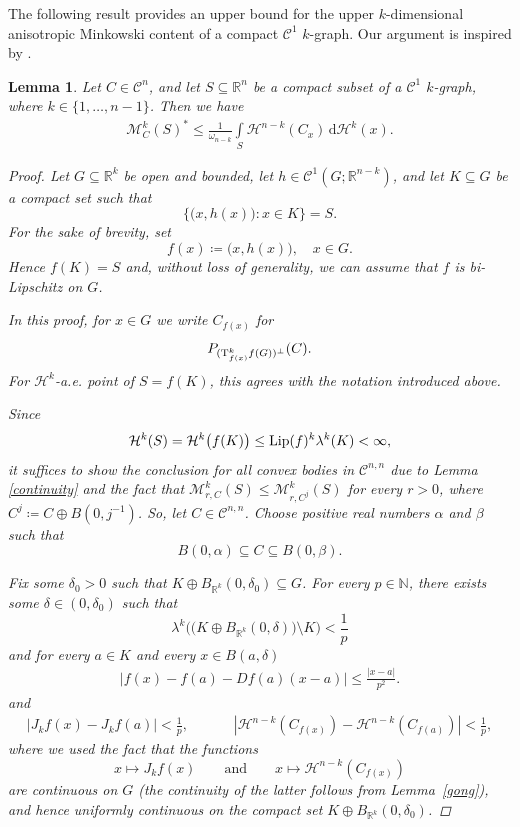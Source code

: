 \documentclass[pdflatex,sn-mathphys-num]{sn-jnl}
\theoremstyle{plain}
\newtheorem{lemma}[theorem]{Lemma}
\theoremstyle{definition}
\newcommand{\dH}[1]{\,\mathrm d\mathcal{H}^{#1}}
\begin{document}
The following result provides an upper bound for the upper 
$k$-dimensional anisotropic Minkowski content of a compact $\mathcal{C}^1$ 
$k$-graph. Our argument is inspired by \cite[Lemma 3.2.38]{federer}.
\begin{lemma}\label{krect}
        Let $C\in\mathcal{C}^n$, and let $S\subseteq\mathbb{R}^n$ be a compact subset of a $\mathcal{C}^1$ $k$-graph, where $k\in\{1, \dots, n-1\}$. Then we have \begin{align*}
            \mathcal{M}^k_{C}(S)^*\leq\frac{1}{\omega_{n-k}}\int\limits_{S}\mathcal{H}^{n-k}(C_x)\dH{k}(x).
        \end{align*}
        \begin{proof} Let $G\subseteq\mathbb{R}^k$ be open and bounded, let $h\in\mathcal{C}^1(G; \mathbb{R}^{n-k})$, and let $K\subseteq G$ be a compact set such that $$\big\{\big(x, h(x)\big) : x\in K\}=S.$$ For the sake of brevity, set $$f(x)\coloneq \big(x, h(x)\big), \quad x\in G.$$ Hence $f(K)=S$ and, without loss of generality, we can assume that  $f$ is bi-Lipschitz on $G$.

        In this proof, for $x\in G$ we write $C_{f(x)}$ for
\[
P_{(\textup{T}^k_{f(x)}f(G))^\perp}(C).
\]
For $\mathcal H^k$-a.e. point of $S=f(K)$, this agrees with the notation
introduced above.

        Since $$\mathcal{H}^k(S)=\mathcal{H}^k\big(f(K)\big)\leq\textup{Lip}(f)^k\lambda^k(K)<\infty,$$ it suffices to show the conclusion for all convex bodies in $\mathcal{C}^{n, n}$ due to Lemma \ref{continuity} and the fact that $\mathcal{M}^k_{r, C}(S)\leq \mathcal{M}^k_{r, C^j}(S)$ for every $r>0$, where $C^j\coloneqq C\oplus B(0, j^{-1})$. So, let $C\in\mathcal{C}^{n, n}$. Choose positive real numbers $\alpha$ and $\beta$ such that \begin{equation}\label{constants}
            B(0, \alpha)\subseteq C \subseteq B(0, \beta).
        \end{equation}
            
            
            Fix some $\delta_0>0$ such that $K\oplus  B_{\mathbb{R}^k}(0, \delta_0)\subseteq G$. For every $p\in\mathbb{N}$, there exists some $\delta\in (0, \delta_0)$ such that 
            \begin{equation}\label{eq1}
                \lambda^k\Big(\big(K\oplus  B_{\mathbb{R}^k}(0, \delta)\big)\setminus K\Big)<\frac{1}{p}
            \end{equation} and for every $a\in K$ and every $x\in B(a, \delta)$ \begin{align}\label{eq2}
                |f(x)-f(a)-Df(a)(x-a)|\leq\frac{|x-a|}{p^2}.
            \end{align} and \begin{align}\label{eq00}
               |J_k{f(x)}-J_k{f(a)}|<\frac{1}{p},&&&&|\mathcal{H}^{n-k}(C_{f(x)})-\mathcal{H}^{n-k}(C_{f(a)})|<\frac{1}{p},
            \end{align} where we used the fact that the functions
$$
x\longmapsto J_kf(x)
\qquad\text{and}\qquad
x\longmapsto\mathcal H^{n-k}(C_{f(x)})
$$
are continuous on $G$ (the continuity of the latter follows from
Lemma~\ref{gong}), and hence uniformly continuous on the compact set
$K\oplus B_{\mathbb R^k}(0, \delta_0)$.


\end{proof}
\end{lemma}
\end{document}

